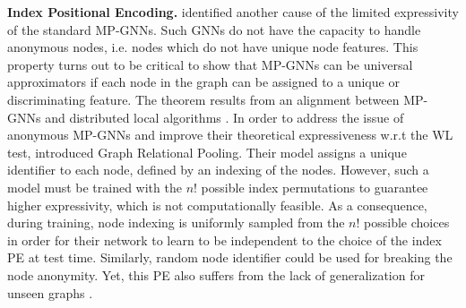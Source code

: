 \documentclass{article} \usepackage{iclr2021_conference,times}
\begin{document}
{\bf Index Positional Encoding.} \cite{Loukas2020What} identified another cause of the limited expressivity of the standard MP-GNNs. Such GNNs do not have the capacity to handle anonymous nodes, i.e. nodes which do not have unique node features. This property turns out to be critical to show that MP-GNNs can be universal approximators if each node in the graph can be assigned to a unique or discriminating feature. The theorem results from an alignment between MP-GNNs and distributed local algorithms \citep{naor1995can, sato2019approximation}. In order to address the issue of anonymous MP-GNNs and improve their theoretical expressiveness w.r.t the WL test, \cite{murphy2019relational} introduced Graph Relational Pooling. Their model assigns a unique identifier to each node, defined by an indexing of the nodes. However, such a model must be trained with the $n!$ possible index permutations to guarantee higher expressivity, which is not computationally feasible. As a consequence, during training, node indexing is uniformly sampled from the $n!$ possible choices in order for their network to learn to be independent to the choice of the index PE at test time. Similarly, random node identifier could be used for breaking the node anonymity. Yet, this PE also suffers from the lack of generalization for unseen graphs \citep{Loukas2020What}. 
\end{document}
